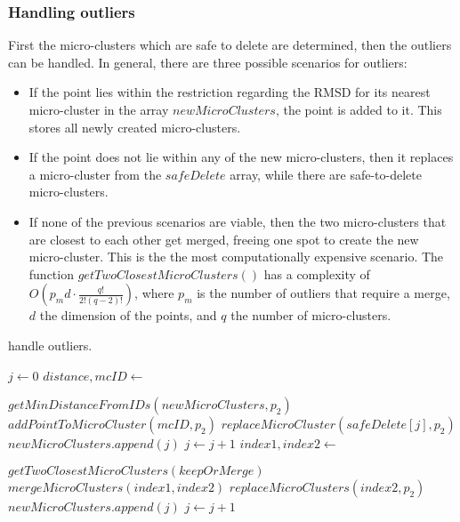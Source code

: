 \subsubsection{Handling outliers}\label{handlingoutliers}


First the micro-clusters which are safe to delete are determined, then the outliers can be handled. In general, there are three possible scenarios for outliers:

\begin{itemize}
 \item If the point lies within the restriction regarding the RMSD for its nearest micro-cluster in the array  $newMicroClusters$, the point is added to it. This stores all newly created micro-clusters.
 \item If the point does not lie within any of the new micro-clusters, then it replaces a micro-cluster from the $safeDelete$ array, while there are safe-to-delete micro-clusters.
 \item If none of the previous scenarios are viable, then the two micro-clusters that are closest to each other get merged, freeing one spot to create the new micro-cluster. This is the the most computationally expensive scenario. The function $getTwoClosestMicroClusters()$ has a complexity of $O(p_{m}d\cdot \frac{q!}{2!(q-2)!})$, where $p_m$ is the number of outliers that require a merge, $d$ the dimension of the points, and $q$ the number of micro-clusters.
\end{itemize}


\begin{algorithm}[h]
 \caption{handle outliers.}\label{alg:handleoutliers}
 \begin{algorithmic}[1]

  \vspace{10pt}
  \State $ j \gets 0$
  \State $distance,mcID \gets $
  \item[] $getMinDistanceFromIDs(newMicroClusters,p_2)$
  \State $addPointToMicroCluster(mcID,p_2)$
  \Else {}
  \State $replaceMicroCluster(safeDelete[j],p_2)$
  \State $newMicroClusters.append(j)$
  \State $j \gets j + 1$
  \Else
  \State $index1,index2 \gets $
  \item[] $getTwoClosestMicroClusters(keepOrMerge)$
  \State $mergeMicroClusters(index1,index2)$
  \State $replaceMicroClusters(index2,p_2)$
  \State $newMicroClusters.append(j)$
  \State $j \gets j + 1$
  \EndIf
  \EndIf
  \EndFor
 \end{algorithmic}
\end{algorithm}

